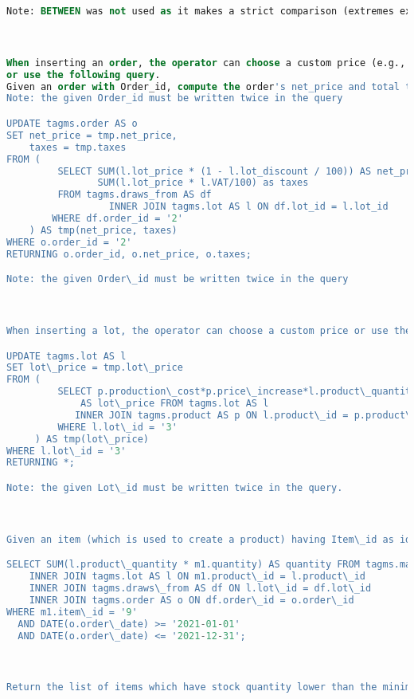 \begin{lstlisting}[language=SQL,
keywordstyle=\color{blue},
stringstyle=\color{mauve},
showstringspaces=false,
basicstyle=\ttfamily\footnotesize]
Note: BETWEEN was not used as it makes a strict comparison (extremes excluded).



When inserting an order, the operator can choose a custom price (e.g., decided with the customer)
or use the following query.
Given an order with Order_id, compute the order's net_price and total taxes.
Note: the given Order_id must be written twice in the query

UPDATE tagms.order AS o
SET net_price = tmp.net_price,
    taxes = tmp.taxes
FROM (
         SELECT SUM(l.lot_price * (1 - l.lot_discount / 100)) AS net_price,
                SUM(l.lot_price * l.VAT/100) as taxes
         FROM tagms.draws_from AS df
                  INNER JOIN tagms.lot AS l ON df.lot_id = l.lot_id
        WHERE df.order_id = '2'
    ) AS tmp(net_price, taxes)
WHERE o.order_id = '2'
RETURNING o.order_id, o.net_price, o.taxes;

Note: the given Order\_id must be written twice in the query



When inserting a lot, the operator can choose a custom price or use the following query. Given a lot with Lot\_id, compute the lot price.

UPDATE tagms.lot AS l
SET lot\_price = tmp.lot\_price
FROM (
         SELECT p.production\_cost*p.price\_increase*l.product\_quantity
             AS lot\_price FROM tagms.lot AS l
            INNER JOIN tagms.product AS p ON l.product\_id = p.product\_id
         WHERE l.lot\_id = '3'
     ) AS tmp(lot\_price)
WHERE l.lot\_id = '3'
RETURNING *;

Note: the given Lot\_id must be written twice in the query.



Given an item (which is used to create a product) having Item\_id as identifier and a time interval (actually, two dates), find the total quantity of that item that has been used for production or packaging during that time.

SELECT SUM(l.product\_quantity * m1.quantity) AS quantity FROM tagms.made\_up\_of\_1 AS m1
    INNER JOIN tagms.lot AS l ON m1.product\_id = l.product\_id
    INNER JOIN tagms.draws\_from AS df ON l.lot\_id = df.lot\_id
    INNER JOIN tagms.order AS o ON df.order\_id = o.order\_id
WHERE m1.item\_id = '9'
  AND DATE(o.order\_date) >= '2021-01-01'
  AND DATE(o.order\_date) <= '2021-12-31';



Return the list of items which have stock quantity lower than the minimum one.


\end{lstlisting}
